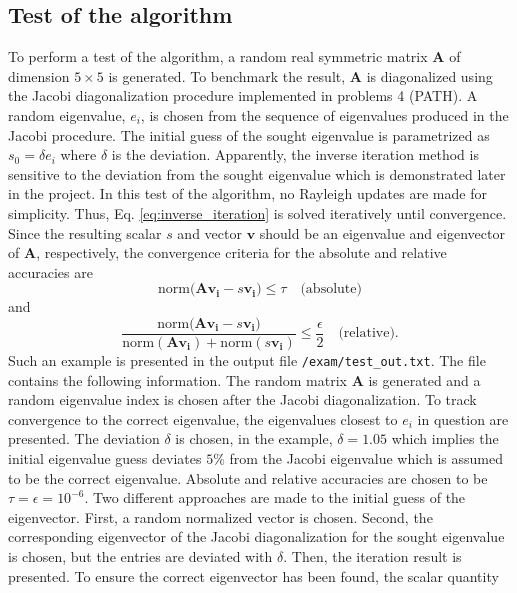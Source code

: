 \documentclass{article}
\begin{document}
	\subsection*{Test of the algorithm}
	To perform a test of the algorithm, a random real symmetric matrix $\mathbf{A}$ of dimension $5\times 5$ is generated. To benchmark the result, $\mathbf{A}$ is diagonalized using the Jacobi diagonalization procedure implemented in problems 4 (PATH). A random eigenvalue, $e_{i}$, is chosen from the sequence of eigenvalues produced in the Jacobi procedure. The initial guess of the sought eigenvalue is parametrized as $s_{0} = \delta e_{i}$ where $\delta$ is the deviation. Apparently, the inverse iteration method is sensitive to the deviation from the sought eigenvalue which is demonstrated later in the project. In this test of the algorithm, no Rayleigh updates are made for simplicity. Thus, Eq. \ref{eq:inverse_iteration} is solved iteratively until convergence. Since the resulting scalar $s$ and vector $\mathbf{v}$ should be an eigenvalue and eigenvector of $\mathbf{A}$, respectively, the convergence criteria for the absolute and relative accuracies are
	\begin{equation}
		\textrm{norm}\Big(\mathbf{A}\mathbf{v_{i}} - s\mathbf{v_{i}}\Big)\leq\tau\quad\textrm{(absolute)}
	\end{equation}
	and
	\begin{equation}
	\frac{\textrm{norm}\Big(\mathbf{A}\mathbf{v_{i}} - s\mathbf{v_{i}}\Big)}{\textrm{norm}(\mathbf{A}\mathbf{v_{i}}) + \textrm{norm}(s\mathbf{v_{i}})}\leq\frac{\epsilon}{2}\quad\textrm{(relative)}.
	\end{equation}
	Such an example is presented in the output file \texttt{/exam/test\_out.txt}. The file contains the following information. The random matrix $\mathbf{A}$ is generated and a random eigenvalue index is chosen after the Jacobi diagonalization. To track convergence to the correct eigenvalue, the eigenvalues closest to $e_{i}$ in question are presented. The deviation $\delta$ is chosen, in the example, $\delta = 1.05$ which implies the initial eigenvalue guess deviates $5\%$ from the Jacobi eigenvalue which is assumed to be the correct eigenvalue. Absolute and relative accuracies are chosen to be $\tau=\epsilon=10^{-6}$. Two different approaches are made to the initial guess of the eigenvector. First, a random normalized vector is chosen. Second, the corresponding eigenvector of the Jacobi diagonalization for the sought eigenvalue is chosen, but the entries are deviated with $\delta$. Then, the iteration result is presented. To ensure the correct eigenvector has been found, the scalar quantity
\end{document}
